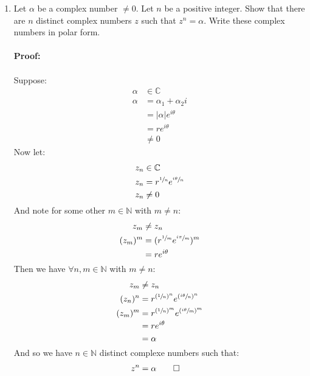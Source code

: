 \begin{enumerate}
	\item Let $\alpha$ be a complex number $\neq 0.$ Let $n$ be a positive integer. Show that there are $n$ distinct complex numbers $z$ such that $z^n = \alpha.$ Write these complex numbers in polar form. \\
	\\
	\textbf{Proof:} \\
	\\
	Suppose:
	\begin{align*}
		\alpha &\in \mathbb{C} \\
		\alpha &= \alpha_1 + \alpha_2 i \\ 
		&= |\alpha|e^{i\theta} \\
		&= r e^{i\theta} \\
		&\neq 0
	\end{align*}
	Now let:
	\begin{align*}
		z_n &\in \mathbb{C} \\
		z_n &= r^{\sfrac{1}{n}}e^{\sfrac{i\theta}{n}} \\
		z_n &\neq 0
	\end{align*}
	And note for some other $m \in \mathbb{N}$ with $m \neq n:$
	\begin{align*}
		z_m &\neq z_n \\
		(z_m)^m &= (r^{\sfrac{1}{m}}e^{\sfrac{i\pi}{m}})^m \\
		&= re^{i\theta}
	\end{align*}
	Then we have $\forall n, m \in \mathbb{N}$ with $m \neq n:$
	\begin{align*}
		z_m &\neq z_n \\
		(z_n)^n &= r^{(\sfrac{1}{n})^n} e^{(\sfrac{i\theta}{n})^n} \\
		(z_m)^m &= r^{(\sfrac{1}{n})^m} e^{(\sfrac{i\theta}{m})^m} \\
		&= re^{i\theta} \\
		&= \alpha
	\end{align*}
	And so we have $n \in \mathbb{N}$ distinct complexe numbers such that:
	\begin{align*}
		z^n &= \alpha \qed
	\end{align*}
	 

\end{enumerate}
